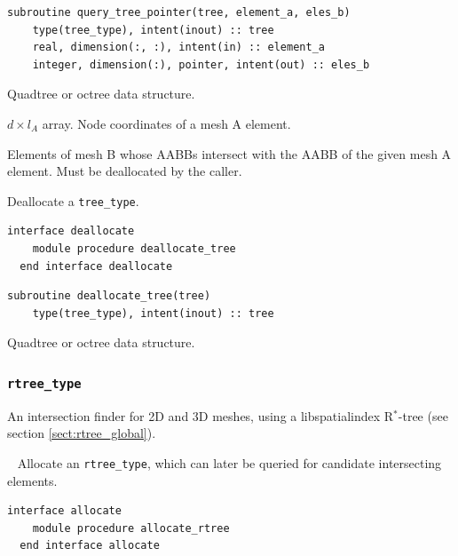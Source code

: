 \documentclass{article}
\begin{document}
\begin{lstlisting}[language=FORTRAN]  
  subroutine query_tree_pointer(tree, element_a, eles_b)
    type(tree_type), intent(inout) :: tree
    real, dimension(:, :), intent(in) :: element_a
    integer, dimension(:), pointer, intent(out) :: eles_b
\end{lstlisting}

\begin{description}[font=\ttfamily\bfseries,leftmargin=2.2\parindent,labelindent=1.7\parindent,noitemsep]
  \item[tree] Quadtree or octree data structure.
  \item[element\_a] $d \times l_A$ array. Node coordinates of a mesh A element.
  \item[eles\_b] Elements of mesh B whose AABBs intersect with the AABB of the
    given mesh A element. Must be deallocated by the caller.
\end{description}

\noindent Deallocate a \verb+tree_type+.
  
\begin{lstlisting}[language=FORTRAN]
  interface deallocate
    module procedure deallocate_tree
  end interface deallocate
\end{lstlisting}
  
\begin{lstlisting}[language=FORTRAN]  
  subroutine deallocate_tree(tree)
    type(tree_type), intent(inout) :: tree
\end{lstlisting}

\begin{description}[font=\ttfamily\bfseries,leftmargin=2.2\parindent,labelindent=1.7\parindent,noitemsep]
  \item[tree] Quadtree or octree data structure.
\end{description}

\subsubsection{\texttt{rtree\_type}}\label{sect:rtree_query}

An intersection finder for 2D and 3D meshes, using a libspatialindex
R${}^*$-tree (see section \ref{sect:rtree_global}).

~\newline
Allocate an \verb+rtree_type+, which can later be queried for candidate
intersecting elements.

\begin{lstlisting}[language=FORTRAN]
  interface allocate
    module procedure allocate_rtree
  end interface allocate
\end{lstlisting}
  
\end{document}
